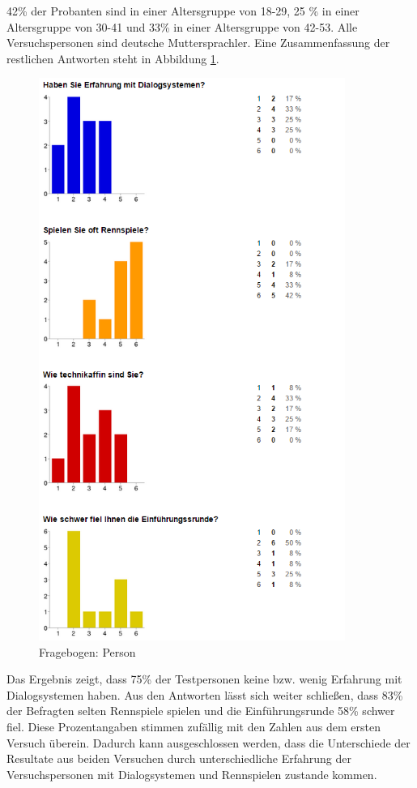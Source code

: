 \documentclass[12pt,a4paper]{scrartcl}
\begin{document}
42\% der Probanten sind in einer Altersgruppe von 18-29, 25 \% in einer Altersgruppe von 30-41 und 33\% in einer Altersgruppe von 42-53. Alle Versuchspersonen sind deutsche Muttersprachler. 
Eine Zusammenfassung der restlichen Antworten steht in Abbildung \ref{fbpersonaus2}.


\begin{figure}[H]
\begin{center}
\includegraphics[width=10cm]{person2.png}
\caption{Fragebogen: Person}
\label{fbpersonaus2}
\end{center}
\end{figure}
\newpage

Das Ergebnis zeigt, dass 75\% der Testpersonen keine bzw. wenig Erfahrung mit Dialogsystemen haben. Aus den Antworten lässt sich weiter schließen, dass 83\% der Befragten selten Rennspiele spielen und die Einführungsrunde 58\% schwer fiel. Diese Prozentangaben stimmen zufällig mit den Zahlen aus dem ersten Versuch überein. Dadurch kann ausgeschlossen werden, dass die Unterschiede der Resultate aus beiden Versuchen durch unterschiedliche Erfahrung der Versuchspersonen mit Dialogsystemen und Rennspielen zustande kommen. 
\end{document}
